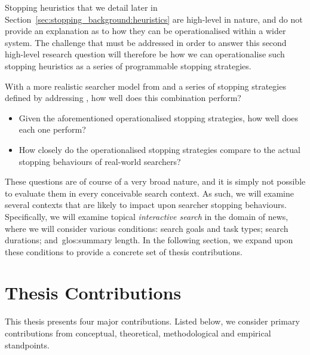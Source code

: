 Stopping heuristics that we detail later in Section~\ref{sec:stopping_background:heuristics} are high-level in nature, and do not provide an explanation as to how they can be operationalised within a wider system. The challenge that must be addressed in order to answer this second high-level research question will therefore be how we can operationalise such stopping heuristics as a series of programmable stopping strategies.

With a more realistic searcher model from  and a series of stopping strategies defined by addressing , how well does this combination perform?

\begin{itemize}
    \item{ Given the aforementioned operationalised stopping strategies, how well does each one perform?}
    \item{ How closely do the operationalised stopping strategies compare to the actual stopping behaviours of real-world searchers?}
\end{itemize}

These questions are of course of a very broad nature, and it is simply not possible to evaluate them in every conceivable search context. As such, we will examine several contexts that are likely to impact upon searcher stopping behaviours. Specifically, we will examine topical \emph{interactive search} in the domain of news, where we will consider various conditions: search goals and task types; search durations; and~\gls{glos:summary} length. In the following section, we expand upon these conditions to provide a concrete set of thesis contributions.

\section{Thesis Contributions}\label{sec:intro:contribs}
This thesis presents four major contributions. Listed below, we consider primary contributions from conceptual, theoretical, methodological and empirical standpoints.

